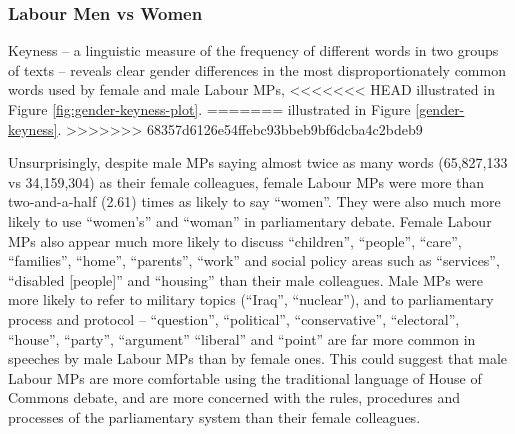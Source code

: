 \documentclass[]{article}
\theoremstyle{definition}
\theoremstyle{definition}
\theoremstyle{definition}
\theoremstyle{remark}
\begin{document}
\begin{table}[H]
\begin{table}[H]
\begin{table}[H]
\begin{table}[H]
\begin{table}[H]
\begin{table}[H]
\begin{table}[H]
\begin{table}[H]
\hypertarget{labour-men-vs-women}{%
\subsubsection{Labour Men vs Women}\label{labour-men-vs-women}}

Keyness -- a linguistic measure of the frequency of different words in
two groups of texts -- reveals clear gender differences in the most
disproportionately common words used by female and male Labour MPs,
<<<<<<< HEAD
illustrated in Figure \ref{fig:gender-keyness-plot}.
=======
illustrated in Figure \ref{gender-keyness}.
>>>>>>> 68357d6126e54ffebc93bbeb9bf6dcba4c2bdeb9

Unsurprisingly, despite male MPs saying almost twice as many words
(65,827,133 vs 34,159,304) as their female colleagues, female Labour MPs
were more than two-and-a-half (2.61) times as likely to say ``women''.
They were also much more likely to use ``women's'' and ``woman'' in
parliamentary debate. Female Labour MPs also appear much more likely to
discuss ``children'', ``people'', ``care'', ``families'', ``home'',
``parents'', ``work'' and social policy areas such as ``services'',
``disabled {[}people{]}'' and ``housing'' than their male colleagues.
Male MPs were more likely to refer to military topics (``Iraq'',
``nuclear''), and to parliamentary process and protocol -- ``question'',
``political'', ``conservative'', ``electoral'', ``house'', ``party'',
``argument'' ``liberal'' and ``point'' are far more common in speeches
by male Labour MPs than by female ones. This could suggest that male
Labour MPs are more comfortable using the traditional language of House
of Commons debate, and are more concerned with the rules, procedures and
processes of the parliamentary system than their female colleagues.


\end{table}
\end{table}
\end{table}
\end{table}
\end{table}
\end{table}
\end{table}
\end{table}
\end{document}
